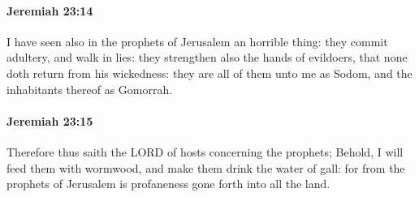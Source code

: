 		\paragraph{Jeremiah 23:14} %
			\label{JEREMIAH-23-14}

			I have seen also in the prophets of Jerusalem an horrible thing: they commit adultery, and walk in lies: they strengthen also the hands of evildoers, that none doth return from his wickedness: they are all of them unto me as Sodom, and the inhabitants thereof as Gomorrah.


		\paragraph{Jeremiah 23:15} %
			\label{JEREMIAH-23-15}

			Therefore thus saith the LORD of hosts concerning the prophets; Behold, I will feed them with wormwood, and make them drink the water of gall: for from the prophets of Jerusalem is profaneness gone forth into all the land.

